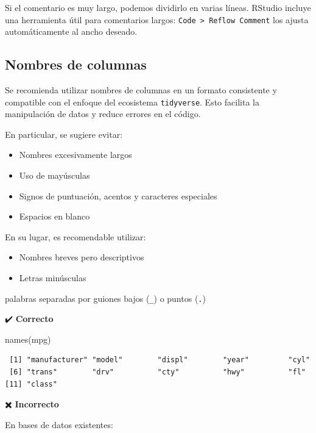 \documentclass[
  spanish,
  a4paper,
]{scrbook}
\newenvironment{Shaded}{\begin{snugshade}}{\end{snugshade}}
\newcommand{\FunctionTok}[1]{\textcolor[rgb]{0.28,0.35,0.67}{#1}}
\newcommand{\NormalTok}[1]{\textcolor[rgb]{0.00,0.23,0.31}{#1}}
\begin{document}
Si el comentario es muy largo, podemos dividirlo en varias líneas.
RStudio incluye una herramienta útil para comentarios largos:
\texttt{Code\ \textgreater{}\ Reflow\ Comment} los ajusta
automáticamente al ancho deseado.

\subsection{Nombres de columnas}\label{nombres-de-columnas}

Se recomienda utilizar nombres de columnas en un formato consistente y
compatible con el enfoque del ecosistema \texttt{tidyverse}. Esto
facilita la manipulación de datos y reduce errores en el código.

En particular, se sugiere evitar:

\begin{itemize}
\item
  Nombres excesivamente largos
\item
  Uso de mayúsculas
\item
  Signos de puntuación, acentos y caracteres especiales
\item
  Espacios en blanco
\end{itemize}

En su lugar, es recomendable utilizar:

\begin{itemize}
\item
  Nombres breves pero descriptivos
\item
  Letras minúsculas
\end{itemize}

palabras separadas por guiones bajos (\texttt{\_}) o puntos (\texttt{.})

✔️ \textbf{Correcto}

\begin{Shaded}
\begin{Highlighting}[]
\FunctionTok{names}\NormalTok{(mpg)}
\end{Highlighting}
\end{Shaded}

\begin{verbatim}
 [1] "manufacturer" "model"        "displ"        "year"         "cyl"         
 [6] "trans"        "drv"          "cty"          "hwy"          "fl"          
[11] "class"       
\end{verbatim}

✖️ \textbf{Incorrecto}

En bases de datos existentes:
\end{document}
